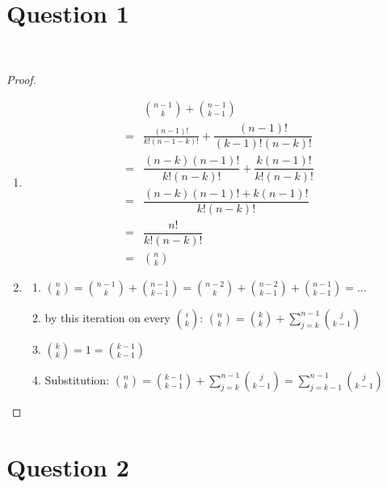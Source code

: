 \documentclass{article}
\begin{document}
\section*{Question 1}

~

\begin{proof}
    ~
    \begin{enumerate}
        \item \begin{align*}
            &\binom{n-1}{k}+\binom{n-1}{k-1}\\
            =&\frac{(n-1)!}{k!(n-1-k)!}+\dfrac{(n-1)!}{(k-1)!(n-k)!}\\
            =&\dfrac{(n-k)(n-1)!}{k!(n-k)!}+\dfrac{k(n-1)!}{k!(n-k)!}\\
            =&\dfrac{(n-k)(n-1)!+k(n-1)!}{k!(n-k)!}\\
            =&\dfrac{n!}{k!(n-k)!}\\
            =&\binom{n}{k}
        \end{align*}
        \item \begin{enumerate}
            \item $\binom{n}{k}=\binom{n-1}{k}+\binom{n-1}{k-1}=\binom{n-2}{k}+\binom{n-2}{k-1}+\binom{n-1}{k-1}=...$
            \item by this iteration on every $\binom{i}{k}$: $\binom{n}{k}=\binom{k}{k}+\sum_{j=k}^{n-1}\binom{j}{k-1}$
            \item $\binom{k}{k}=1=\binom{k-1}{k-1}$
            \item Substitution: $\binom{n}{k}=\binom{k-1}{k-1}+\sum_{j=k}^{n-1}\binom{j}{k-1}=\sum_{j=k-1}^{n-1}\binom{j}{k-1}$
        \end{enumerate}
    \end{enumerate}
\end{proof}

\newpage

\section*{Question 2}

~
\end{document}
